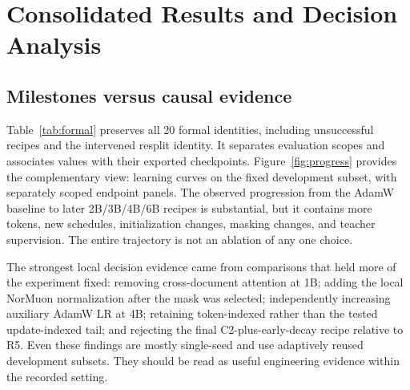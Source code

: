 
\section{Consolidated Results and Decision Analysis}
\label{sec:results}

\subsection{Milestones versus causal evidence}

Table~\ref{tab:formal} preserves all 20 formal identities, including unsuccessful recipes and the intervened resplit identity. It separates evaluation scopes and associates values with their exported checkpoints. Figure~\ref{fig:progress} provides the complementary view: learning curves on the fixed development subset, with separately scoped endpoint panels. The observed progression from the AdamW baseline to later 2B/3B/4B/6B recipes is substantial, but it contains more tokens, new schedules, initialization changes, masking changes, and teacher supervision. The entire trajectory is not an ablation of any one choice.

The strongest local decision evidence came from comparisons that held more of the experiment fixed: removing cross-document attention at 1B; adding the local NorMuon normalization after the mask was selected; independently increasing auxiliary AdamW LR at 4B; retaining token-indexed rather than the tested update-indexed tail; and rejecting the final C2-plus-early-decay recipe relative to R5. Even these findings are mostly single-seed and use adaptively reused development subsets. They should be read as useful engineering evidence within the recorded setting.




